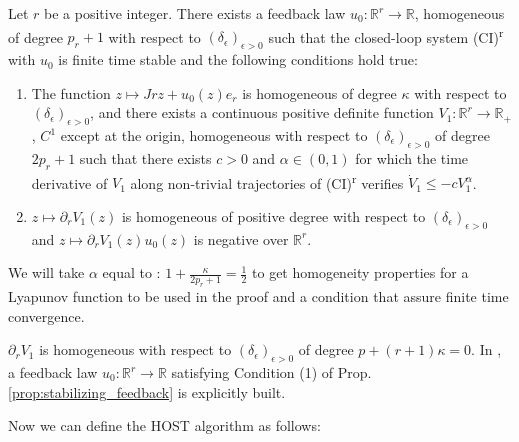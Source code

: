 \begin{Proposition}
\label{prop:stabilizing_feedback}
Let \( r \) be a positive integer. There exists a feedback law \( u_0 : \mathbb{R}^r \to \mathbb{R} \), 
homogeneous of degree \( p_r + 1 \) with respect to \( (\delta_\epsilon)_{\epsilon > 0} \) such that the 
closed-loop system (CI)\textsuperscript{r} with \( u_0 \) is finite time stable and the following conditions 
hold true:

\begin{enumerate}
    \item The function \( z \mapsto Jr z + u_0(z) e_r \) is homogeneous of degree \( \kappa \) with 
    respect to \( (\delta_\epsilon)_{\epsilon > 0} \), and there exists a continuous positive definite 
    function \( V_1: \mathbb{R}^r \to \mathbb{R}_+ \), \( C^1 \) except at the origin, homogeneous with 
    respect to \( (\delta_\epsilon)_{\epsilon > 0} \) of degree \( 2p_r + 1 \) such that there exists 
    \( c > 0 \) and \( \alpha \in (0, 1) \) for which the time derivative of \( V_1 \) along non-trivial 
    trajectories of (CI)\textsuperscript{r} verifies \( \dot{V}_1 \leq -cV_1^\alpha \).
    \item \( z \mapsto \partial_r V_1(z) \) is homogeneous of positive degree with respect 
    to \( (\delta_\epsilon)_{\epsilon > 0} \) and \( z \mapsto \partial_r V_1(z)u_0(z) \) is 
    negative over \( \mathbb{R}^r \).
\end{enumerate}


\end{Proposition}


We will take \( \alpha \) equal to : \( 1 + \frac{\kappa}{2p_r + 1} = \frac{1}{2} \) to get homogeneity properties
for a Lyapunov function to be used in the proof and a condition that assure finite time convergence.

\( \partial_r V_1 \) is homogeneous with respect to \( (\delta_\epsilon)_{\epsilon > 0} \) of 
degree \( p + (r + 1)\kappa = 0 \). In \cite{Hong2005}, a feedback law \( u_0: \mathbb{R}^r \to \mathbb{R} \) 
satisfying Condition (1) of Prop.\ref{prop:stabilizing_feedback} is explicitly built.

Now we can define the HOST algorithm as follows:

